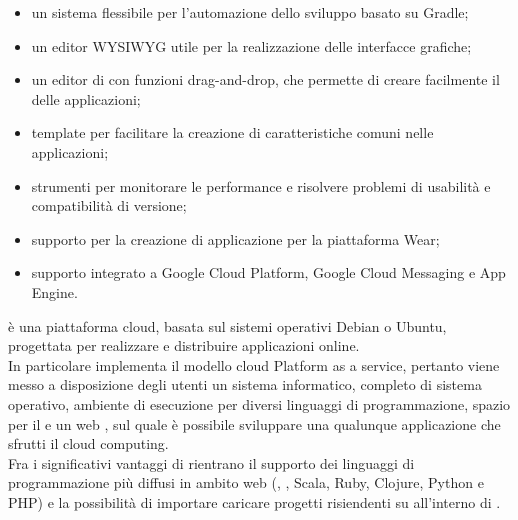 		\begin{itemize}
			\item un sistema flessibile per l'automazione dello sviluppo basato su Gradle;
			\item un editor WYSIWYG utile per la realizzazione delle interfacce grafiche;
			\item un editor di  con funzioni drag-and-drop, che permette di creare facilmente il  delle applicazioni;
			\item template per facilitare la creazione di caratteristiche comuni nelle applicazioni;
			\item strumenti per monitorare le performance e risolvere problemi di usabilità e compatibilità di versione;
			\item supporto per la creazione di applicazione per la piattaforma  Wear;
			\item supporto integrato a Google Cloud Platform, Google Cloud Messaging e App Engine.
		\end{itemize}
		 è una piattaforma cloud, basata sul sistemi operativi Debian o Ubuntu, progettata per realizzare e distribuire applicazioni online. \\
		In particolare  implementa il modello cloud Platform as a service, pertanto viene messo a disposizione degli utenti un sistema informatico, completo di sistema operativo, ambiente di esecuzione per diversi linguaggi di programmazione, spazio per il  e un web , sul quale è possibile sviluppare una qualunque applicazione che sfrutti il cloud computing.\\
		Fra i significativi vantaggi di  rientrano il supporto dei linguaggi di programmazione più diffusi in ambito web (, , Scala, Ruby, Clojure, Python e PHP) e la possibilità di importare caricare progetti risiendenti su  all'interno di .
	
